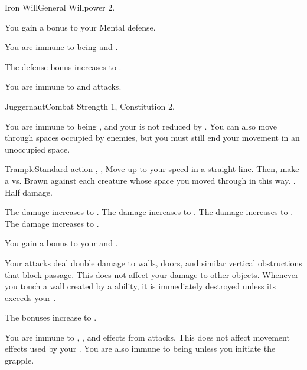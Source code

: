   \begin{feat}{Iron Will}{General}
    \featpre Willpower 2.

     You gain a  bonus to your Mental defense.

     You are immune to being \dazed and \confused.

     The defense bonus increases to .

     You are immune to  and  attacks.
  \end{feat}

  \begin{feat}{Juggernaut}{Combat}
    \featpre Strength 1, Constitution 2.

     You are immune to being \slowed, and your  is not reduced by .
    You can also move through spaces occupied by enemies, but you must still end your movement in an unoccupied space.

    \begin{activeability}{Trample}{Standard action}
      \abilitytags {}, \atPhysical, 
      \rankline
      Move up to your speed in a straight line.
      Then, make a  vs. Brawn against each creature whose space you moved through in this way.
      \hit \damagerankthree.
      \miss Half damage.

      \rankline
       The damage increases to \damagerankfour.
       The damage increases to \damagerankfive.
       The damage increases to \damageranksix.
       The damage increases to \damagerankseven.
    \end{activeability}

     You gain a  bonus to your  and .

     Your attacks deal double damage to walls, doors, and similar vertical obstructions that block passage.
    This does not affect your damage to other objects.
    Whenever you touch a wall created by a  ability, it is immediately destroyed unless its  exceeds your .

     The bonuses increase to .

     You are immune to , , and  effects from attacks.
    This does not affect movement effects used by your .
    You are also immune to being \grappled unless you initiate the grapple.
  \end{feat}

